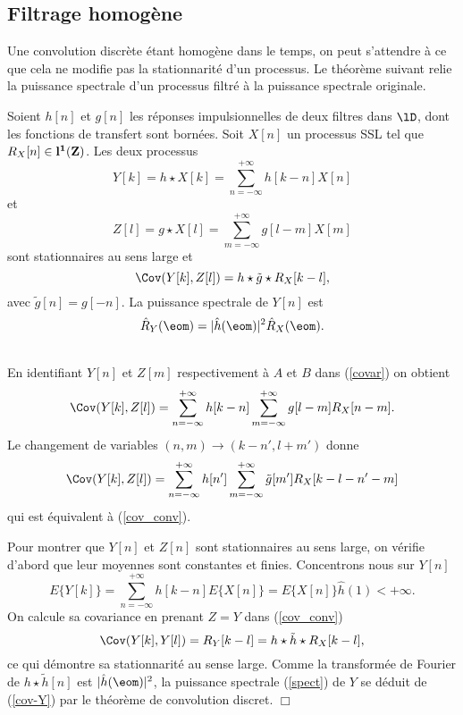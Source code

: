 \subsection{Filtrage homog\`ene}

Une convolution discr\`ete \'etant homog\`ene dans le temps,
on peut s'attendre \`a ce que cela ne modifie pas la stationnarit\'e
d'un processus. Le th\'eor\`eme suivant 
relie la puissance spectrale
d'un processus filtr\'e \`a la puissance spectrale originale.

\begin{theorem}
\label{cov_conv_th} 
Soient $h[n]$ et
$g [n]$ les r\'eponses impulsionnelles de deux filtres dans
$\lD$, dont les fonctions de transfert sont born\'ees.
Soit $X[n]$ un processus SSL tel que $R_X [n] \in {\bf l ^ 1 ({\bf{Z}})}$. 
Les deux processus
\[
Y[k] = h \star X [k] = \sum_{n=-\infty}^{+\infty} h[k-n] X[n] 
\]
et 
\[ 
Z[l] = g \star X [l] = \sum_{m=-\infty}^{+\infty} g[l-m] X[m]  
\]
sont stationnaires au sens large et
\begin{equation}
\label{cov_conv}
\Cov(Y[k],Z[l]) = h \star \tilde g \star R_X [k-l] ,
\end{equation}
avec $\tilde g[n] = g[-n]$. La puissance spectrale de $Y[n]$ est
\begin{equation}
\label{spect}
\hat R_{Y} (\eom) = |\hat h (\eom)|^2 \hat R_X (\eom) .
\end{equation}
\end{theorem}

\\
En identifiant $Y[n]$ et $Z[m]$ respectivement \`a $A$ et $B$
dans (\ref{covar}) on obtient
\[
\Cov(Y[k], Z[l]) = \sum_{n=-\infty}^{+\infty} h[k-n]
\sum_{m=-\infty}^{+\infty} g[l-m] R_X[n-m].
\]
Le changement de variables $(n,m) \rightarrow (k-n',l+m')$
donne 
\[
\Cov(Y[k], Z[l]) = \sum_{n=-\infty}^{+\infty} h[n']
\sum_{m=-\infty}^{+\infty} \tilde g[m'] R_X[k-l-n'-m]
\]
qui est \'equivalent \`a (\ref{cov_conv}). 

Pour montrer que $Y[n]$ et $Z[n]$ sont stationnaires 
au sens large, on v\'erifie d'abord que leur moyennes sont 
constantes et finies. Concentrons nous sur $Y[n]$
\[
E\{ Y[k]\} = \sum_{n=-\infty}^{+\infty} h[k-n] E \{ X[n] \} =
E \{ X[n] \} \hat h (1) < + \infty.
\]
On calcule sa covariance en prenant $Z = Y$ dans (\ref{cov_conv}) 
\begin{equation}
\label{cov-Y}
\Cov(Y[k], Y[l]) = R_Y [k-l] = h \star \tilde h \star R_X [k-l] ,
\end{equation}
ce qui d\'emontre sa stationnarit\'e au sense large.
Comme la transform\'ee de Fourier de $h \star \tilde h[n]$
est $|\hat h (\eom)|^2$, 
la puissance spectrale (\ref{spect}) de $Y$ se d\'eduit de
(\ref{cov-Y}) par le th\'eor\`eme de convolution discret. $\Box$\\
\\

